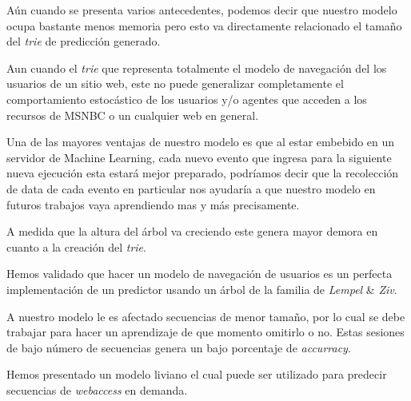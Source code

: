 Aún cuando se presenta varios antecedentes, podemos decir que nuestro modelo ocupa bastante menos memoria pero esto va directamente relacionado el tamaño del \emph{trie} de predicción generado.

%
Aun cuando el \emph{trie} que representa totalmente el modelo de navegación del los usuarios de un sitio web, este no puede generalizar completamente el comportamiento estocástico de los usuarios y/o agentes que acceden a los recursos de MSNBC o un cualquier web en general.

Una de las mayores ventajas de nuestro modelo es que al estar embebido en un servidor de Machine Learning, cada nuevo evento que ingresa para la siguiente nueva ejecución esta estará mejor preparado, podríamos decir que la recolección de data de cada evento en particular nos ayudaría a que nuestro modelo en futuros trabajos vaya aprendiendo mas y más precisamente.


A medida que la altura del árbol va creciendo este genera mayor demora en cuanto a la creación del \emph{trie}.

Hemos validado que hacer un modelo de navegación de usuarios es un perfecta implementación de un predictor usando un árbol de la familia de \emph{Lempel} \& \emph{Ziv}.

A nuestro modelo le es afectado secuencias de menor tamaño, por lo cual se debe trabajar para hacer un aprendizaje de que momento omitirlo o no. Estas sesiones de bajo número de secuencias genera un bajo porcentaje de \emph{accurracy}. 



Hemos presentado un modelo liviano el cual puede ser utilizado para predecir secuencias de \emph{webaccess} en demanda.










